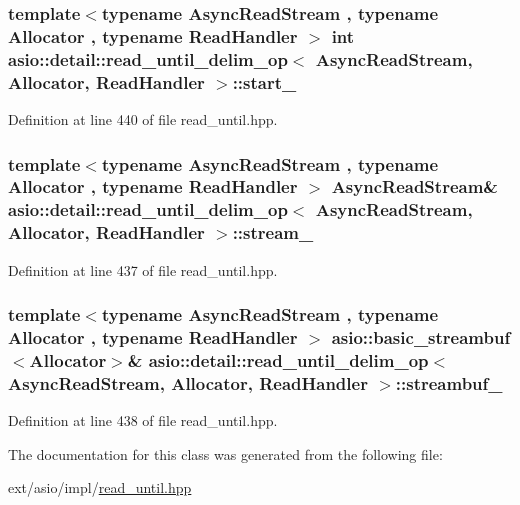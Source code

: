 \subsubsection[{start\+\_\+}]{\setlength{\rightskip}{0pt plus 5cm}template$<$typename Async\+Read\+Stream , typename Allocator , typename Read\+Handler $>$ int {\bf asio\+::detail\+::read\+\_\+until\+\_\+delim\+\_\+op}$<$ Async\+Read\+Stream, Allocator, Read\+Handler $>$\+::start\+\_\+}\label{classasio_1_1detail_1_1read__until__delim__op_a75f7ed240fb758a37f0893150aea7fd1}


Definition at line 440 of file read\+\_\+until.\+hpp.

\hypertarget{classasio_1_1detail_1_1read__until__delim__op_a1bb807733f7f03ea6eb5956c251eea4a}{}
\subsubsection[{stream\+\_\+}]{\setlength{\rightskip}{0pt plus 5cm}template$<$typename Async\+Read\+Stream , typename Allocator , typename Read\+Handler $>$ Async\+Read\+Stream\& {\bf asio\+::detail\+::read\+\_\+until\+\_\+delim\+\_\+op}$<$ Async\+Read\+Stream, Allocator, Read\+Handler $>$\+::stream\+\_\+}\label{classasio_1_1detail_1_1read__until__delim__op_a1bb807733f7f03ea6eb5956c251eea4a}


Definition at line 437 of file read\+\_\+until.\+hpp.

\hypertarget{classasio_1_1detail_1_1read__until__delim__op_abdf7bd4e2142014b91065a9150d8f366}{}
\subsubsection[{streambuf\+\_\+}]{\setlength{\rightskip}{0pt plus 5cm}template$<$typename Async\+Read\+Stream , typename Allocator , typename Read\+Handler $>$ {\bf asio\+::basic\+\_\+streambuf}$<$Allocator$>$\& {\bf asio\+::detail\+::read\+\_\+until\+\_\+delim\+\_\+op}$<$ Async\+Read\+Stream, Allocator, Read\+Handler $>$\+::streambuf\+\_\+}\label{classasio_1_1detail_1_1read__until__delim__op_abdf7bd4e2142014b91065a9150d8f366}


Definition at line 438 of file read\+\_\+until.\+hpp.



The documentation for this class was generated from the following file\+:\begin{DoxyCompactItemize}
\item 
ext/asio/impl/\hyperlink{impl_2read__until_8hpp}{read\+\_\+until.\+hpp}\end{DoxyCompactItemize}
